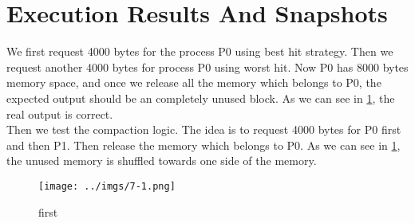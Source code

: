 \documentclass[12pt]{extarticle}
\newcommand{\<}{\langle}
\renewcommand{\>}{\rangle}
\theoremstyle{definition}
\begin{document}
	\section{Execution Results And Snapshots}
	We first request 4000 bytes for the process P0 using best hit strategy. Then we request another 4000 bytes for process P0 using worst hit. Now P0 has 8000 bytes memory space, and once we release all the memory which belongs to P0, the expected output should be an completely unused block. As we can see in \ref{fig1}, the real output is correct.\\
	Then we test the compaction logic. The idea is to request 4000 bytes for P0 first and then P1. Then release the memory which belongs to P0. As we can see in \ref{fig1}, the unused memory is shuffled towards one side of the memory.
	\begin{figure}[H]
	\centering 
	\texttt{[image: ../imgs/7-1.png]}
	\caption{first}
	\label{fig1}
	\end{figure} 
\end{document}
